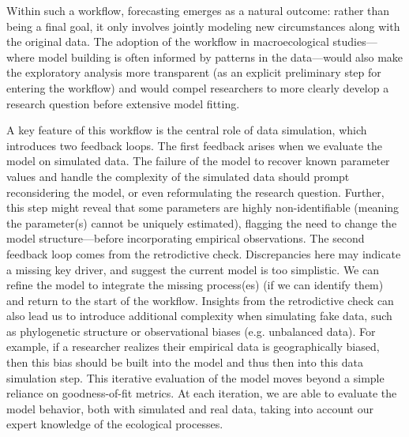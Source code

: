 \documentclass[11pt]{article}
\begin{document}
Within such a workflow, forecasting emerges as a natural outcome: rather than being a final goal, it only involves jointly modeling new circumstances along with the original data. The adoption of the workflow in macroecological studies---where model building is often informed by patterns in the data---would also make the exploratory analysis more transparent (as an explicit preliminary step for entering the workflow) and would compel researchers to more clearly develop a research question before extensive model fitting. 

A key feature of this workflow is the central role of data simulation, which introduces two feedback loops. The first feedback arises when we evaluate the model on simulated data.
The failure of the model to recover known parameter values and handle the complexity of the simulated data should prompt reconsidering the model, or even reformulating the research question.
Further, this step might reveal that some parameters are highly non-identifiable (meaning the parameter(s) cannot be uniquely estimated),
flagging the need to change the model structure---before incorporating empirical observations. 
The second feedback loop comes from the retrodictive check. 
Discrepancies here may indicate a missing key driver, and suggest the current model is too simplistic. We can refine the model to integrate the missing process(es) (if we can identify them) and return to the start of the workflow. Insights from the retrodictive check can also lead us to introduce additional complexity when simulating fake data, such as phylogenetic structure or observational biases (e.g. unbalanced data). For example, if a researcher realizes their empirical data is geographically biased, then this bias should be built into the model and thus then into this data simulation step. This iterative evaluation of the model moves beyond a simple reliance on goodness-of-fit metrics. At each iteration, we are able to evaluate the model behavior, both with simulated and real data, taking into account our expert knowledge of the ecological processes. 
\end{document}

